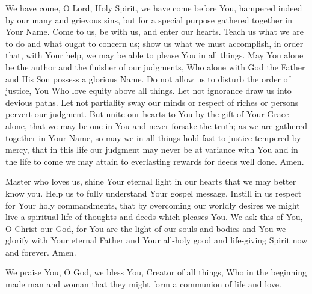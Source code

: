 
We have come, O Lord, Holy Spirit, we have come before You, hampered indeed by our many and grievous sins, but for a special purpose gathered together in Your Name.
Come to us, be with us, and enter our hearts.
Teach us what we are to do and what ought to concern us;
show us what we must accomplish, in order that, with Your help, we may be able to please You in all things.
May You alone be the author and the finisher of our judgments, Who alone with God the Father and His Son possess a glorious Name.
Do not allow us to disturb the order of justice, You Who love equity above all things.
Let not ignorance draw us into devious paths.
Let not partiality sway our minds or respect of riches or persons pervert our judgment.
But unite our hearts to You by the gift of Your Grace alone, that we may be one in You and never forsake the truth;
as we are gathered together in Your Name, so may we in all things hold fast to justice tempered by mercy, that in this life our judgment may never be at variance with You and in the life to come we may attain to everlasting rewards for deeds well done.
Amen.

Master who loves us, shine Your eternal light in our hearts that we may better know you.
Help us to fully understand Your gospel message.
Instill in us respect for Your holy commandments, that by overcoming our worldly desires we might live a spiritual life of thoughts and deeds which pleases You.
We ask this of You, O Christ our God, for You are the light of our souls and bodies and You we glorify with Your eternal Father and Your all-holy good and life-giving Spirit now and forever.
Amen.

We praise You, O God, we bless You, Creator of all things, Who in the beginning made man and woman that they might form a communion of life and love.

